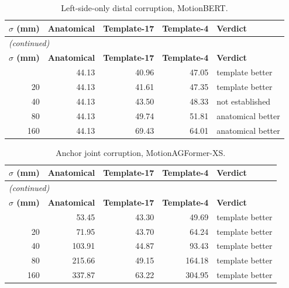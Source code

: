 \vspace{0.6cm}

\begin{center}
{\fontsize{10}{12}\selectfont
\begin{longtable}{rrrrl}
\caption{Left-side-only distal corruption, MotionBERT.}\label{tab:appasymmetric_motionbert}\\
\hline
\textbf{$\sigma$ (mm)} & \textbf{Anatomical} & \textbf{Template-17} & \textbf{Template-4} & \textbf{Verdict} \\
\hline
\endfirsthead
\multicolumn{5}{l}{\textit{(continued)}}\\
\hline
\textbf{$\sigma$ (mm)} & \textbf{Anatomical} & \textbf{Template-17} & \textbf{Template-4} & \textbf{Verdict} \\
\hline
\endhead
\hline
\endfoot
0 & 44.13 & 40.96 & 47.05 & template better \\
20 & 44.13 & 41.61 & 47.35 & template better \\
40 & 44.13 & 43.50 & 48.33 & not established \\
80 & 44.13 & 49.74 & 51.81 & anatomical better \\
160 & 44.13 & 69.43 & 64.01 & anatomical better \\
\end{longtable}
}
\end{center}

\vspace{0.6cm}

\begin{center}
{\fontsize{10}{12}\selectfont
\begin{longtable}{rrrrl}
\caption{Anchor joint corruption, MotionAGFormer-XS.}\label{tab:appanchor_corruption_xs}\\
\hline
\textbf{$\sigma$ (mm)} & \textbf{Anatomical} & \textbf{Template-17} & \textbf{Template-4} & \textbf{Verdict} \\
\hline
\endfirsthead
\multicolumn{5}{l}{\textit{(continued)}}\\
\hline
\textbf{$\sigma$ (mm)} & \textbf{Anatomical} & \textbf{Template-17} & \textbf{Template-4} & \textbf{Verdict} \\
\hline
\endhead
\hline
\endfoot
0 & 53.45 & 43.30 & 49.69 & template better \\
20 & 71.95 & 43.70 & 64.24 & template better \\
40 & 103.91 & 44.87 & 93.43 & template better \\
80 & 215.66 & 49.15 & 164.18 & template better \\
160 & 337.87 & 63.22 & 304.95 & template better \\
\end{longtable}
}
\end{center}

